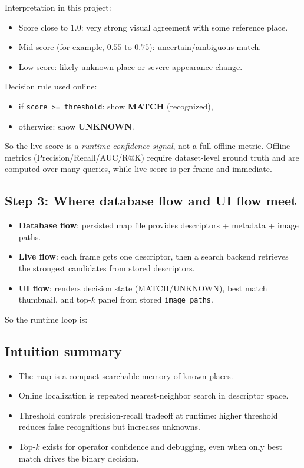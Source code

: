 \documentclass[11pt]{article}
\begin{document}
Interpretation in this project:
\begin{itemize}[leftmargin=*]
  \item Score close to $1.0$: very strong visual agreement with some reference place.
  \item Mid score (for example, $0.55$ to $0.75$): uncertain/ambiguous match.
  \item Low score: likely unknown place or severe appearance change.
\end{itemize}

Decision rule used online:
\begin{itemize}[leftmargin=*]
  \item if \texttt{score >= threshold}: show \textbf{MATCH} (recognized),
  \item otherwise: show \textbf{UNKNOWN}.
\end{itemize}

So the live score is a \emph{runtime confidence signal}, not a full offline metric. Offline metrics (Precision/Recall/AUC/R@K) require dataset-level ground truth and are computed over many queries, while live score is per-frame and immediate.

\subsection{Step 3: Where database flow and UI flow meet}
\begin{itemize}[leftmargin=*]
  \item \textbf{Database flow}: persisted map file provides descriptors + metadata + image paths.
  \item \textbf{Live flow}: each frame gets one descriptor, then a search backend retrieves the strongest candidates from stored descriptors.
  \item \textbf{UI flow}: renders decision state (MATCH/UNKNOWN), best match thumbnail, and top-$k$ panel from stored \texttt{image\_paths}.
\end{itemize}

So the runtime loop is:
\begin{center}
\end{center}

\subsection{Intuition summary}
\begin{itemize}[leftmargin=*]
  \item The map is a compact searchable memory of known places.
  \item Online localization is repeated nearest-neighbor search in descriptor space.
  \item Threshold controls precision-recall tradeoff at runtime: higher threshold reduces false recognitions but increases unknowns.
  \item Top-$k$ exists for operator confidence and debugging, even when only best match drives the binary decision.
\end{itemize}
\end{document}
